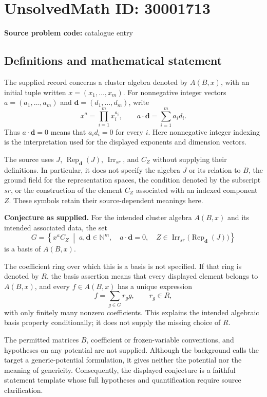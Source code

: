 \documentclass[11pt]{article}
\begin{document}
\section*{UnsolvedMath ID: 30001713}
\textbf{Source problem code:} catalogue entry
\subsection{Definitions and mathematical statement}
The supplied record concerns a cluster algebra denoted by \(A(B,x)\), with an initial tuple written \(x=(x_1,\ldots,x_m)\). For nonnegative integer vectors \(a=(a_1,\ldots,a_m)\) and \(\mathbf d=(d_1,\ldots,d_m)\), write
\[
x^a=\prod_{i=1}^m x_i^{a_i},\qquad a\cdot\mathbf d=\sum_{i=1}^m a_i d_i.
\]
Thus \(a\cdot\mathbf d=0\) means that \(a_i d_i=0\) for every \(i\). Here nonnegative integer indexing is the interpretation used for the displayed exponents and dimension vectors.

The source uses \(J\), \(\operatorname{Rep}_{\mathbf d}(J)\), \(\operatorname{Irr}_{sr}\), and \(C_Z\) without supplying their definitions. In particular, it does not specify the algebra \(J\) or its relation to \(B\), the ground field for the representation spaces, the condition denoted by the subscript \(sr\), or the construction of the element \(C_Z\) associated with an indexed component \(Z\). These symbols retain their source-dependent meanings here.

\textbf{Conjecture as supplied.} For the intended cluster algebra \(A(B,x)\) and its intended associated data, the set
\[
G=\left\{x^a C_Z\;\middle|\;
 a,\mathbf d\in\mathbb N^m,\quad
 a\cdot\mathbf d=0,\quad
 Z\in\operatorname{Irr}_{sr}\bigl(\operatorname{Rep}_{\mathbf d}(J)\bigr)
\right\}
\]
is a basis of \(A(B,x)\).

The coefficient ring over which this is a basis is not specified. If that ring is denoted by \(R\), the basis assertion means that every displayed element belongs to \(A(B,x)\), and every \(f\in A(B,x)\) has a unique expression
\[
f=\sum_{g\in G}r_g g,\qquad r_g\in R,
\]
with only finitely many nonzero coefficients. This explains the intended algebraic basis property conditionally; it does not supply the missing choice of \(R\).

The permitted matrices \(B\), coefficient or frozen-variable conventions, and hypotheses on any potential are not supplied. Although the background calls the target a generic-potential formulation, it gives neither the potential nor the meaning of genericity. Consequently, the displayed conjecture is a faithful statement template whose full hypotheses and quantification require source clarification.
\end{document}
